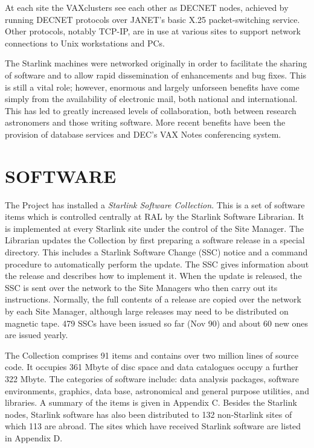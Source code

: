At each site the VAXclusters see each other as DECNET nodes, achieved by
running DECNET protocols over JANET's basic X.25 packet-switching service.
Other protocols, notably TCP-IP, are in use at various sites to support
network connections to Unix workstations and PCs.

The Starlink machines were networked originally in order to facilitate the
sharing of software and to allow rapid dissemination of enhancements and
bug fixes.
This is still a vital role; however, enormous and largely unforseen benefits
have come simply from the availability of electronic mail, both national and
international.
This has led to greatly increased levels of collaboration, both between
research astronomers and those writing software.
More recent benefits have been the provision of database services and DEC's
VAX Notes conferencing system.

\section {SOFTWARE}

The Project has installed a {\em Starlink Software Collection}.
This is a set of software items which is controlled centrally at RAL by the
Starlink Software Librarian.
It is implemented at every Starlink site under the control of the Site Manager.
The Librarian updates the Collection by first preparing a software
release in a special directory.
This includes a Starlink Software Change (SSC) notice and a command procedure
to automatically perform the update.
The SSC gives information about the release and describes how to implement it.
When the update is released, the SSC is sent over the network to the Site
Managers who then carry out its instructions.
Normally, the full contents of a release are copied over the network by each
Site Manager, although large releases may need to be distributed on magnetic
tape.
479 SSCs have been issued so far (Nov 90) and about 60 new ones are issued
yearly.

The Collection comprises 91 items and contains over two million lines of
source code.
It occupies 361 Mbyte of disc space and data catalogues occupy a further
322 Mbyte.
The categories of software include: data analysis packages, software
environments, graphics, data base, astronomical and general purpose utilities,
and libraries.
A summary of the items is given in Appendix C.
Besides the Starlink nodes, Starlink software has also been distributed to 132
non-Starlink sites of which 113 are abroad.
The sites which have received Starlink software are listed in Appendix D.

